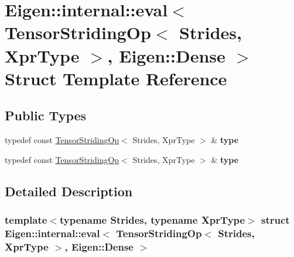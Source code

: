 \hypertarget{struct_eigen_1_1internal_1_1eval_3_01_tensor_striding_op_3_01_strides_00_01_xpr_type_01_4_00_01_eigen_1_1_dense_01_4}{}\section{Eigen\+:\+:internal\+:\+:eval$<$ Tensor\+Striding\+Op$<$ Strides, Xpr\+Type $>$, Eigen\+:\+:Dense $>$ Struct Template Reference}
\label{struct_eigen_1_1internal_1_1eval_3_01_tensor_striding_op_3_01_strides_00_01_xpr_type_01_4_00_01_eigen_1_1_dense_01_4}
\subsection*{Public Types}
\begin{DoxyCompactItemize}
\item 
\mbox{\label{struct_eigen_1_1internal_1_1eval_3_01_tensor_striding_op_3_01_strides_00_01_xpr_type_01_4_00_01_eigen_1_1_dense_01_4_acb2d36e169ab3762adaf78ab370ce57a}} 
typedef const \hyperlink{class_eigen_1_1_tensor_striding_op}{Tensor\+Striding\+Op}$<$ Strides, Xpr\+Type $>$ \& {\bfseries type}
\item 
\mbox{\label{struct_eigen_1_1internal_1_1eval_3_01_tensor_striding_op_3_01_strides_00_01_xpr_type_01_4_00_01_eigen_1_1_dense_01_4_acb2d36e169ab3762adaf78ab370ce57a}} 
typedef const \hyperlink{class_eigen_1_1_tensor_striding_op}{Tensor\+Striding\+Op}$<$ Strides, Xpr\+Type $>$ \& {\bfseries type}
\end{DoxyCompactItemize}


\subsection{Detailed Description}
\subsubsection*{template$<$typename Strides, typename Xpr\+Type$>$\newline
struct Eigen\+::internal\+::eval$<$ Tensor\+Striding\+Op$<$ Strides, Xpr\+Type $>$, Eigen\+::\+Dense $>$}



